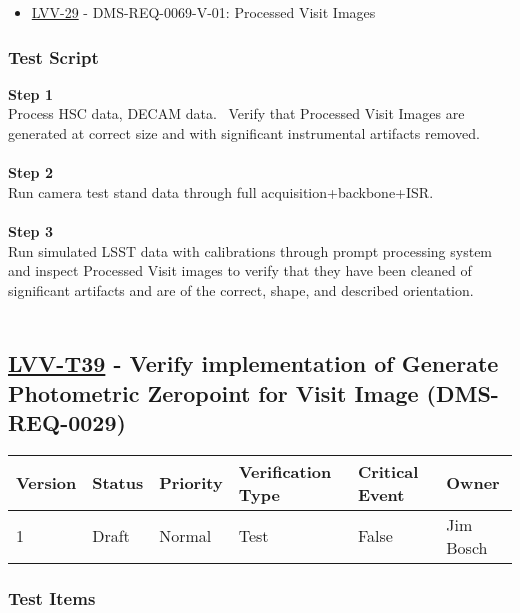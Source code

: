 \begin{itemize}
\tightlist
\item
  \href{https://jira.lsstcorp.org/browse/LVV-29}{LVV-29} -
  DMS-REQ-0069-V-01: Processed Visit Images
\end{itemize}

\hypertarget{test-script-128}{%
\subsubsection{Test Script}\label{test-script-128}}

\textbf{Step 1}\\
Process HSC data, DECAM data. ~Verify that Processed Visit Images are
generated at correct size and with significant instrumental artifacts
removed.\\
~\\
\textbf{Step 2}\\
Run camera test stand data through full acquisition+backbone+ISR.\\
~\\
\textbf{Step 3}\\
Run simulated LSST data with calibrations through prompt processing
system and inspect Processed Visit images to verify that they have been
cleaned of significant artifacts and are of the correct, shape, and
described orientation.\\
~\\

\hypertarget{lvv-t39---verify-implementation-of-generate-photometric-zeropoint-for-visit-image-dms-req-0029}{%
\subsection{\texorpdfstring{\href{https://jira.lsstcorp.org/secure/Tests.jspa\#/testCase/LVV-T39}{LVV-T39}
- Verify implementation of Generate Photometric Zeropoint for Visit
Image
(DMS-REQ-0029)}{LVV-T39 - Verify implementation of Generate Photometric Zeropoint for Visit Image (DMS-REQ-0029)}}\label{lvv-t39---verify-implementation-of-generate-photometric-zeropoint-for-visit-image-dms-req-0029}}

\begin{longtable}[]{@{}llllll@{}}
\toprule
Version & Status & Priority & Verification Type & Critical Event &
Owner\tabularnewline
\midrule
\endhead
1 & Draft & Normal & Test & False & Jim Bosch\tabularnewline
\bottomrule
\end{longtable}

\hypertarget{test-items-128}{%
\subsubsection{Test Items}\label{test-items-128}}


